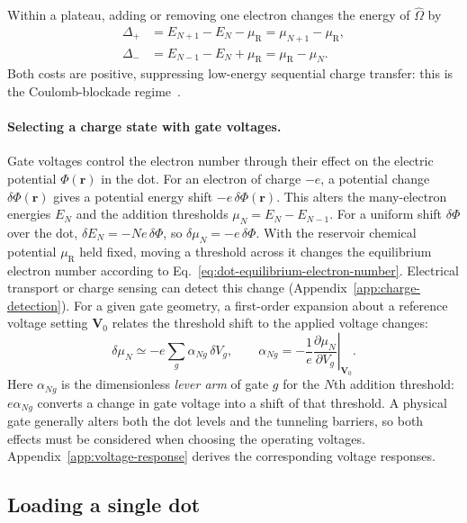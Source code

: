 Within a plateau, adding or removing one electron changes
the energy of $\widehat{\Omega}$ by
\begin{align}
  \Delta_+&=E_{N+1}-E_N-\mu_{\mathrm R}
             =\mu_{N+1}-\mu_{\mathrm R},\\
  \Delta_-&=E_{N-1}-E_N+\mu_{\mathrm R}
             =\mu_{\mathrm R}-\mu_N.
  \label{eq:dot-charge-transfer-costs}
\end{align}
Both costs are positive, suppressing low-energy sequential
charge transfer: this is the Coulomb-blockade regime~\cite{Beenakker1991}.

\paragraph{Selecting a charge state with gate voltages.}
Gate voltages control the electron number through their effect on
the electric potential $\Phi(\mathbf r)$ in the dot. For an electron
of charge $-e$, a potential change $\delta\Phi(\mathbf r)$ gives a
potential energy shift $-e\,\delta\Phi(\mathbf r)$. This alters the many-electron energies
$E_N$ and the addition thresholds $\mu_N=E_N-E_{N-1}$.
For a uniform shift $\delta\Phi$ over the dot,
$\delta E_N=-Ne\,\delta\Phi$, so $\delta\mu_N=-e\,\delta\Phi$.
With the reservoir chemical potential $\mu_{\mathrm R}$ held fixed,
moving a threshold across it changes the equilibrium electron
number according to Eq.~\eqref{eq:dot-equilibrium-electron-number}.
Electrical transport or charge sensing can detect this change
(Appendix~\ref{app:charge-detection}). For a given gate geometry,
a first-order expansion about a reference voltage setting
$\mathbf V_0$ relates the threshold shift to the applied voltage changes:
\begin{equation}
 \delta\mu_N\simeq-e\sum_g\alpha_{Ng}\,\delta V_g,
 \qquad
 \alpha_{Ng}=-\frac1e
       \left.\frac{\partial\mu_N}{\partial V_g}\right|_{\mathbf V_0}.
 \label{eq:platform-gate-response}
\end{equation}
Here $\alpha_{Ng}$ is the dimensionless \emph{lever arm} of gate $g$
for the $N$th addition threshold: $e\alpha_{Ng}$ converts a change
in gate voltage into a shift of that threshold. A physical gate
generally alters both the dot levels and the tunneling barriers,
so both effects must be considered when choosing the operating
voltages. Appendix~\ref{app:voltage-response} derives the corresponding
voltage responses.

\subsection{Loading a single dot}
\label{sec:single-dot-loading}

